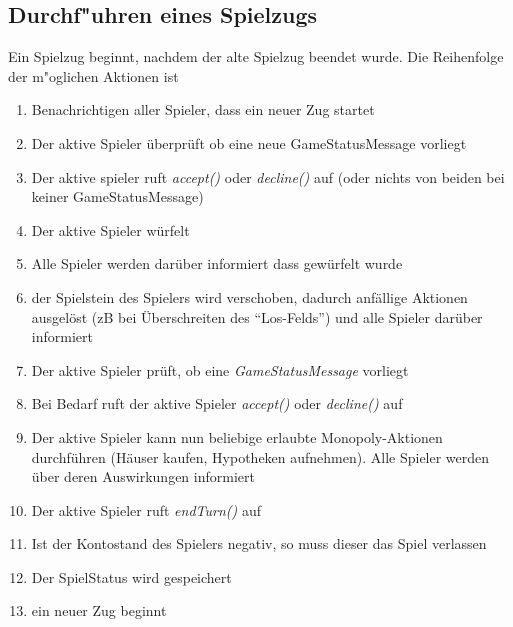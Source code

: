 \documentclass[a4paper,10pt]{article}
\begin{document}
\subsection{Durchf"uhren eines Spielzugs}
Ein Spielzug beginnt, nachdem der alte Spielzug beendet wurde. Die Reihenfolge der m"oglichen Aktionen ist
\begin{enumerate}
\item Benachrichtigen aller Spieler, dass ein neuer Zug startet
\item Der aktive Spieler überprüft ob eine neue GameStatusMessage vorliegt
\item Der aktive spieler ruft \textit{accept()} oder \textit{decline()} auf (oder nichts von beiden bei keiner GameStatusMessage)
\item Der aktive Spieler würfelt
\item Alle Spieler werden darüber informiert dass gewürfelt wurde
\item der Spielstein des Spielers wird verschoben, dadurch anfällige Aktionen ausgelöst (zB bei Überschreiten des "`Los-Felds"') und alle Spieler darüber informiert
\item Der aktive Spieler prüft, ob eine \textit{GameStatusMessage} vorliegt
\item Bei Bedarf ruft der aktive Spieler \textit{accept()} oder \textit{decline()} auf
\item Der aktive Spieler kann nun beliebige erlaubte Monopoly-Aktionen durchführen (Häuser kaufen, Hypotheken aufnehmen). Alle Spieler werden über deren Auswirkungen informiert
\item Der aktive Spieler ruft \textit{endTurn()} auf
\item Ist der Kontostand des Spielers negativ, so muss dieser das Spiel verlassen
\item Der SpielStatus wird gespeichert
\item ein neuer Zug beginnt
\end{enumerate}
\newpage
\end{document}
